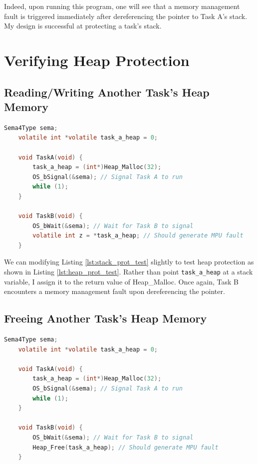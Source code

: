 Indeed, upon running this program, one will see that a memory management fault is triggered immediately after dereferencing the pointer to Task A's stack. My design is successful at protecting a task's stack.

\section{Verifying Heap Protection}

\subsection{Reading/Writing Another Task's Heap Memory}

\begin{lstlisting}[language=c, caption={Heap Protection Test Program (Read/Write)}, captionpos=b, label={lst:heap_prot_test}, float]
    Sema4Type sema;
    volatile int *volatile task_a_heap = 0;
    
    void TaskA(void) {
        task_a_heap = (int*)Heap_Malloc(32);
        OS_bSignal(&sema); // Signal Task A to run
        while (1);
    }
    
    void TaskB(void) {
        OS_bWait(&sema); // Wait for Task B to signal
        volatile int z = *task_a_heap; // Should generate MPU fault
    }
\end{lstlisting}

We can modifying Listing \ref{lst:stack_prot_test} slightly to test heap protection as shown in Listing \ref{lst:heap_prot_test}. Rather than point \texttt{task\_a\_heap} at a stack variable, I assign it to the return value of Heap\_Malloc. Once again, Task B encounters a memory management fault upon dereferencing the pointer.

\subsection{Freeing Another Task's Heap Memory}

\begin{lstlisting}[language=c, caption={Heap Protection Test Program (Free)}, captionpos=b, label={lst:heap_free_test}, float]
    Sema4Type sema;
    volatile int *volatile task_a_heap = 0;
    
    void TaskA(void) {
        task_a_heap = (int*)Heap_Malloc(32);
        OS_bSignal(&sema); // Signal Task A to run
        while (1);
    }
    
    void TaskB(void) {
        OS_bWait(&sema); // Wait for Task B to signal
        Heap_Free(task_a_heap); // Should generate MPU fault
    }
\end{lstlisting}

